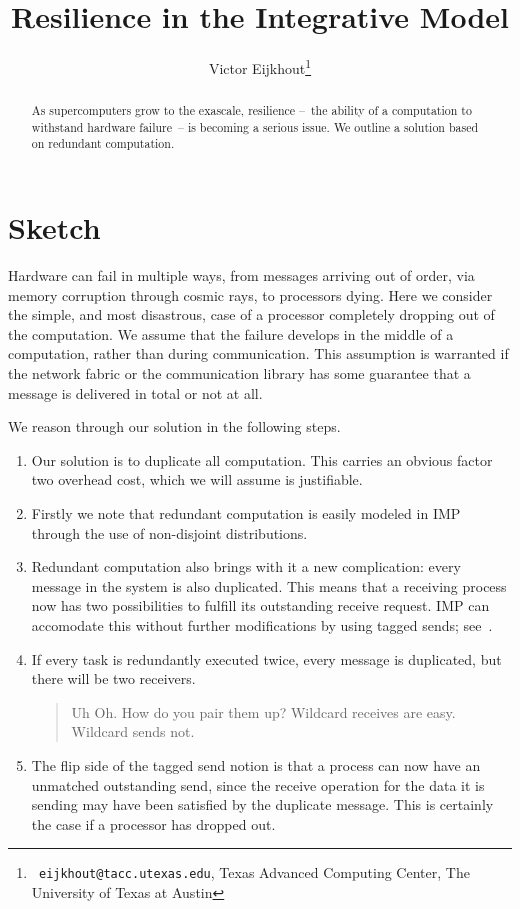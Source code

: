 \documentclass[11pt,fleqn,preprint]{taccreport}
\title[IMP resilience]{Resilience in the Integrative Model}
\author[Eijkhout]{Victor Eijkhout\thanks{{\tt
      eijkhout@tacc.utexas.edu}, Texas Advanced Computing Center, The
    University of Texas at Austin}}
\begin{document}
\maketitle

\begin{abstract}
As supercomputers grow to the exascale, resilience 
--~the ability of a computation to withstand hardware failure~--
is becoming a serious issue.
We outline a solution based on redundant computation.
\end{abstract}

\section{Sketch}

Hardware can fail in multiple ways, from messages arriving out of order, via memory corruption
through cosmic rays, to processors dying. Here we consider the simple, and most disastrous,
case of a  processor completely dropping out of the computation. We assume that the failure
develops in the middle of a computation, rather than during communication. This assumption is warranted
if the network fabric or the communication library has some guarantee that a message is delivered
in total or not at all.

We reason through our solution in the following steps.
\begin{enumerate}
\item Our solution is to duplicate all computation. This carries an obvious factor two overhead cost,
  which we will assume is justifiable.
\item Firstly we note that redundant computation is easily modeled
  in \ac{IMP} through the use of non-disjoint distributions. 
\item Redundant computation also
  brings with it a new complication: every message in the system is also duplicated.
  This means that a receiving process now has two possibilities to fulfill its outstanding receive
  request. \ac{IMP} can accomodate this without further modifications by using tagged sends; 
  see~\cite{IMP-07}.
\item If every task is redundantly executed twice, every message is duplicated, but there will be
  two receivers. 
  \begin{quotation}
    Uh Oh. How do you pair them up? Wildcard receives are easy. Wildcard sends not.
  \end{quotation}
\item The flip side of the tagged send notion is that a process can now have an unmatched outstanding send,
  since the receive operation for the data it is sending may have been satisfied by the duplicate message.
  This is certainly the case if a processor has dropped out.
\end{enumerate}
\end{document}
